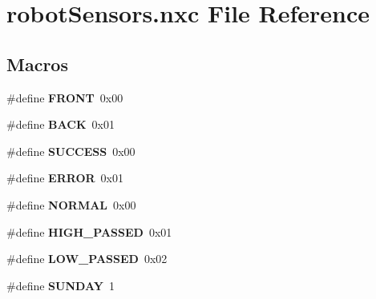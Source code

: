 \hypertarget{robot_sensors_8nxc}{\section{robot\-Sensors.\-nxc File Reference}
\label{robot_sensors_8nxc}
}
\subsection*{Macros}
\begin{DoxyCompactItemize}
\item 
\hypertarget{group___direction_gac25c6a324554f8ae267ad7c1638074a8}{\#define {\bfseries F\-R\-O\-N\-T}~0x00}\label{group___direction_gac25c6a324554f8ae267ad7c1638074a8}

\item 
\hypertarget{group___direction_gab303ee384877c80cb8855bf0113faf88}{\#define {\bfseries B\-A\-C\-K}~0x01}\label{group___direction_gab303ee384877c80cb8855bf0113faf88}

\item 
\hypertarget{group___status_gaa90cac659d18e8ef6294c7ae337f6b58}{\#define {\bfseries S\-U\-C\-C\-E\-S\-S}~0x00}\label{group___status_gaa90cac659d18e8ef6294c7ae337f6b58}

\item 
\hypertarget{group___status_ga8fe83ac76edc595f6b98cd4a4127aed5}{\#define {\bfseries E\-R\-R\-O\-R}~0x01}\label{group___status_ga8fe83ac76edc595f6b98cd4a4127aed5}

\item 
\hypertarget{group___mode_ga1291f416b069313021b519eea62d5bf1}{\#define {\bfseries N\-O\-R\-M\-A\-L}~0x00}\label{group___mode_ga1291f416b069313021b519eea62d5bf1}

\item 
\hypertarget{group___mode_ga816ed092a592f64b41097b7bcd1344f8}{\#define {\bfseries H\-I\-G\-H\-\_\-\-P\-A\-S\-S\-E\-D}~0x01}\label{group___mode_ga816ed092a592f64b41097b7bcd1344f8}

\item 
\hypertarget{group___mode_ga86e080a389eff01ba6b7852767b48357}{\#define {\bfseries L\-O\-W\-\_\-\-P\-A\-S\-S\-E\-D}~0x02}\label{group___mode_ga86e080a389eff01ba6b7852767b48357}

\item 
\hypertarget{group___day__of___week_ga6764dc0bd7e59b4eca8d525f8136fd86}{\#define {\bfseries S\-U\-N\-D\-A\-Y}~1}\label{group___day__of___week_ga6764dc0bd7e59b4eca8d525f8136fd86}


\end{DoxyCompactItemize}
